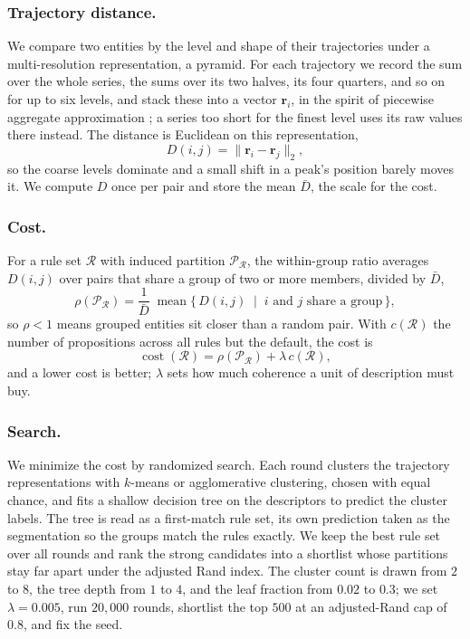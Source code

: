 \documentclass[runningheads]{llncs}
\begin{document}
\subsubsection{Trajectory distance.}
We compare two entities by the level and shape of their trajectories under a multi-resolution representation, a pyramid. For each trajectory we record the sum over the whole series, the sums over its two halves, its four quarters, and so on for up to six levels, and stack these into a vector $\mathbf{r}_i$, in the spirit of piecewise aggregate approximation \citep{keogh2001dimensionality}; a series too short for the finest level uses its raw values there instead. The distance is Euclidean on this representation,
\begin{equation}
D(i,j) = \lVert \mathbf{r}_i - \mathbf{r}_j \rVert_2 ,
\end{equation}
so the coarse levels dominate and a small shift in a peak's position barely moves it. We compute $D$ once per pair and store the mean $\bar{D}$, the scale for the cost.

\subsubsection{Cost.}
For a rule set $\mathcal{R}$ with induced partition $\mathcal{P}_{\mathcal{R}}$, the within-group ratio averages $D(i,j)$ over pairs that share a group of two or more members, divided by $\bar{D}$,
\begin{equation}
\rho(\mathcal{P}_{\mathcal{R}}) = \frac{1}{\bar{D}} \; \operatorname{mean}\{\, D(i,j) \;\mid\; i \text{ and } j \text{ share a group} \,\},
\end{equation}
so $\rho < 1$ means grouped entities sit closer than a random pair. With $c(\mathcal{R})$ the number of propositions across all rules but the default, the cost is
\begin{equation}
\operatorname{cost}(\mathcal{R}) = \rho(\mathcal{P}_{\mathcal{R}}) + \lambda \, c(\mathcal{R}) ,
\end{equation}
and a lower cost is better; $\lambda$ sets how much coherence a unit of description must buy.

\subsubsection{Search.}
We minimize the cost by randomized search. Each round clusters the trajectory representations with $k$-means or agglomerative clustering, chosen with equal chance, and fits a shallow decision tree \citep{breiman1984cart} on the descriptors to predict the cluster labels. The tree is read as a first-match rule set, its own prediction taken as the segmentation so the groups match the rules exactly. We keep the best rule set over all rounds and rank the strong candidates into a shortlist whose partitions stay far apart under the adjusted Rand index. The cluster count is drawn from $2$ to $8$, the tree depth from $1$ to $4$, and the leaf fraction from $0.02$ to $0.3$; we set $\lambda = 0.005$, run $20{,}000$ rounds, shortlist the top $500$ at an adjusted-Rand cap of $0.8$, and fix the seed.
\end{document}
